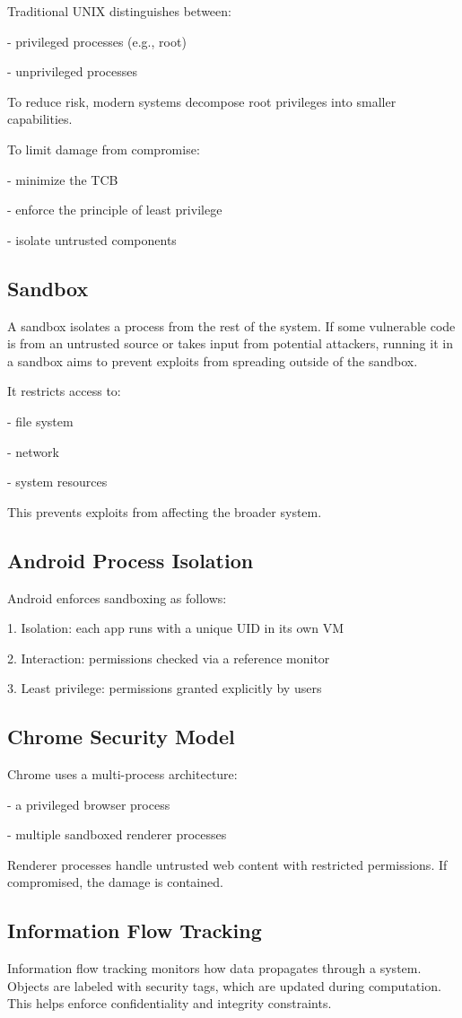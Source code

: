 Traditional UNIX distinguishes between:

- privileged processes (e.g., root)

- unprivileged processes

To reduce risk, modern systems decompose root privileges into smaller capabilities.

To limit damage from compromise:

- minimize the TCB

- enforce the principle of least privilege

- isolate untrusted components

\subsection{Sandbox}
A sandbox isolates a process from the rest of the system. If some vulnerable code is from an untrusted source or takes input from potential attackers, running it in a sandbox aims to prevent exploits from spreading outside of the sandbox. 

It restricts access to:

- file system

- network

- system resources

This prevents exploits from affecting the broader system.

\subsection{Android Process Isolation}
Android enforces sandboxing as follows:

1. Isolation: each app runs with a unique UID in its own VM

2. Interaction: permissions checked via a reference monitor

3. Least privilege: permissions granted explicitly by users

\subsection{Chrome Security Model}
Chrome uses a multi-process architecture:

- a privileged browser process

- multiple sandboxed renderer processes

Renderer processes handle untrusted web content with restricted permissions. If compromised, the damage is contained.

\subsection{Information Flow Tracking}
Information flow tracking monitors how data propagates through a system. Objects are labeled with security tags, which are updated during computation. This helps enforce confidentiality and integrity constraints.